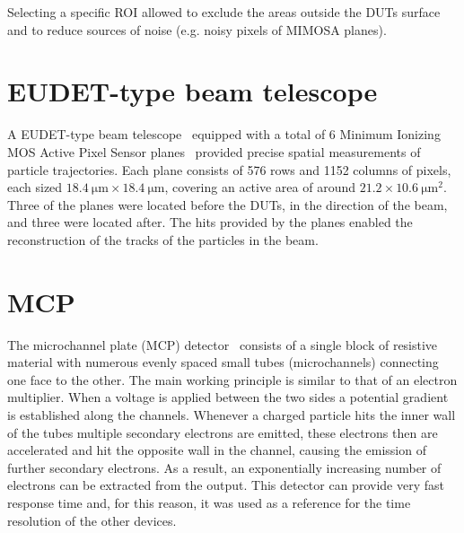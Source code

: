 Selecting a specific ROI allowed to exclude the areas outside the DUTs surface and to reduce sources of noise (e.g. noisy pixels of MIMOSA planes). %

\section{EUDET-type beam telescope}
A EUDET-type beam telescope~\cite{Jansen:2016bkd} equipped with a total of 6 Minimum Ionizing MOS Active Pixel Sensor planes~\cite{Hu-Guo:2010lrq} provided precise spatial measurements of particle trajectories. Each plane consists of 576 rows and 1152 columns of pixels, each sized \(\qty{18.4}{\micro\meter} \times \qty{18.4}{\micro\meter}\), covering an active area of around \(\num{21.2} \times \qty{10.6}{\micro\meter^2}\). Three of the planes were located before the DUTs, in the direction of the beam, and three were located after. The hits provided by the planes enabled the reconstruction of the tracks of the particles in the beam.

\section{MCP}\label{sec:MCP_description}
The microchannel plate (MCP) detector~\cite{LADISLASWIZA1979587} consists of a single block of resistive material with numerous evenly spaced small tubes (microchannels) connecting one face to the other. The main working principle is similar to that of an electron multiplier. When a voltage is applied between the two sides a potential gradient is established along the channels. Whenever a charged particle hits the inner wall of the tubes multiple secondary electrons are emitted, these electrons then are accelerated and hit the opposite wall in the channel, causing the emission of further secondary electrons. As a result, an exponentially increasing number of electrons can be extracted from the output. This detector can provide very fast response time and, for this reason, it was used as a reference for the time resolution of the other devices.


